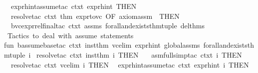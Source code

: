 \begin{isabellebody}
\ \ expr{\isacharunderscore}{\kern0pt}hint{\isacharunderscore}{\kern0pt}assume{\isacharunderscore}{\kern0pt}tac\ ctxt\ expr{\isacharunderscore}{\kern0pt}hint\ THEN{\isacharprime}{\kern0pt}\isanewline
\ \ {\isacharparenleft}{\kern0pt}resolve{\isacharunderscore}{\kern0pt}tac\ ctxt\ {\isacharbrackleft}{\kern0pt}{\isacharat}{\kern0pt}{\isacharbraceleft}{\kern0pt}thm\ expr{\isacharunderscore}{\kern0pt}to{\isacharunderscore}{\kern0pt}vc{\isacharbraceright}{\kern0pt}\ OF\ {\isacharbrackleft}{\kern0pt}axiom{\isacharunderscore}{\kern0pt}assm{\isacharbrackright}{\kern0pt}\ {\isacharbrackright}{\kern0pt}{\isacharparenright}{\kern0pt}\ THEN{\isacharprime}{\kern0pt}\isanewline
\ \ b{\isacharunderscore}{\kern0pt}vc{\isacharunderscore}{\kern0pt}expr{\isacharunderscore}{\kern0pt}rel{\isacharunderscore}{\kern0pt}final{\isacharunderscore}{\kern0pt}tac\ ctxt\ assms\ forall{\isacharunderscore}{\kern0pt}and{\isacharunderscore}{\kern0pt}exists{\isacharunderscore}{\kern0pt}thm{\isacharunderscore}{\kern0pt}tuple\ del{\isacharunderscore}{\kern0pt}thms\isanewline
{\isacartoucheclose}\ \ \isanewline
\isanewline
{}\isamarkupfalse%
\ {\isacartoucheopen}\isanewline
{\isacharparenleft}{\kern0pt}{\isacharasterisk}{\kern0pt}{\isacharasterisk}{\kern0pt}\ Tactics\ to\ deal\ with\ assume\ statements\ {\isacharasterisk}{\kern0pt}{\isacharasterisk}{\kern0pt}{\isacharparenright}{\kern0pt}\isanewline
fun\ b{\isacharunderscore}{\kern0pt}assume{\isacharunderscore}{\kern0pt}base{\isacharunderscore}{\kern0pt}tac\ ctxt\ inst{\isacharunderscore}{\kern0pt}thm\ vc{\isacharunderscore}{\kern0pt}elim\ expr{\isacharunderscore}{\kern0pt}hint\ global{\isacharunderscore}{\kern0pt}assms\ forall{\isacharunderscore}{\kern0pt}and{\isacharunderscore}{\kern0pt}exists{\isacharunderscore}{\kern0pt}thm{\isacharunderscore}{\kern0pt}tuple\ i\ {\isacharequal}{\kern0pt}\isanewline
{\isacharparenleft}{\kern0pt}resolve{\isacharunderscore}{\kern0pt}tac\ ctxt\ {\isacharbrackleft}{\kern0pt}inst{\isacharunderscore}{\kern0pt}thm{\isacharbrackright}{\kern0pt}\ i{\isacharparenright}{\kern0pt}\ THEN\ \isanewline
\ \ {\isacharparenleft}{\kern0pt}asm{\isacharunderscore}{\kern0pt}full{\isacharunderscore}{\kern0pt}simp{\isacharunderscore}{\kern0pt}tac\ ctxt\ i{\isacharparenright}{\kern0pt}\ THEN\isanewline
\ \ {\isacharparenleft}{\kern0pt}resolve{\isacharunderscore}{\kern0pt}tac\ ctxt\ {\isacharbrackleft}{\kern0pt}vc{\isacharunderscore}{\kern0pt}elim{\isacharbrackright}{\kern0pt}\ i{\isacharparenright}{\kern0pt}\ THEN\isanewline
\ \ {\isacharparenleft}{\kern0pt}expr{\isacharunderscore}{\kern0pt}hint{\isacharunderscore}{\kern0pt}assume{\isacharunderscore}{\kern0pt}tac\ ctxt\ expr{\isacharunderscore}{\kern0pt}hint\ i{\isacharparenright}{\kern0pt}\ THEN\isanewline

\end{isabellebody}
